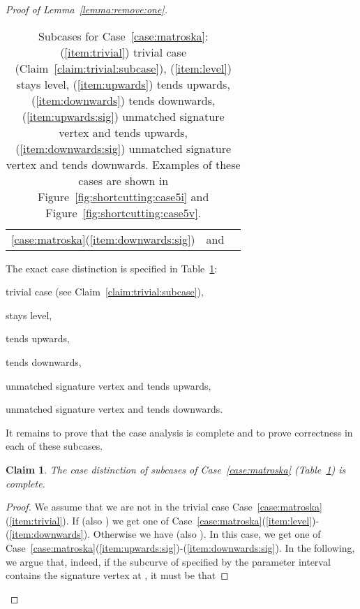 \documentclass[11pt, letter]{article}
\newtheorem{claim}[theorem]{Claim}
\newcommand{\lemref}[1]{Lemma~\ref{lemma:#1}}
\newcommand{\figref}[1]{Figure~\ref{fig:#1}}
\newcommand{\tablab}[1]{\label{tab:#1}}
\newcommand{\tabref}[1]{Table~\ref{tab:#1}}
\newcommand{\caseref}[1]{Case~\ref{case:#1}}
\newcommand{\claimlab}[1]{\label{claim:#1}}
\newcommand{\claimref}[1]{Claim~\ref{claim:#1}}
\begin{document}
\begin{proof}[Proof of \lemref{remove:one}]
\begin{table}[h]
\begin{tabular}{|c|m{7.5cm}|m{5cm}|}
& 
\newline
\newline
\newline
\newline

\\
\hline
\ref{case:matroska}(\ref{item:downwards:sig}) & 
 and \newline

&
\newline
\newline
\\
\hline
\end{tabular}
\caption{Subcases for \caseref{matroska}:
(\ref{item:trivial}) trivial case (\claimref{trivial:subcase}),
(\ref{item:level})  stays level, 
(\ref{item:upwards})  tends upwards,
(\ref{item:downwards})  tends downwards,
(\ref{item:upwards:sig}) unmatched signature vertex and  tends upwards,
(\ref{item:downwards:sig}) unmatched signature vertex and  tends downwards.
Examples of these cases are shown in \figref{shortcutting:case5i} and
\figref{shortcutting:case5v}.
}
\tablab{matroska:subcases}
\end{table}


The exact case distinction is specified in \tabref{matroska:subcases}:
\begin{inparaenum}[(i)]
\item trivial case (see \claimref{trivial:subcase}),\label{item:trivial} 
\item  stays level, \label{item:level}
\item  tends upwards,\label{item:upwards}
\item  tends downwards,\label{item:downwards}
\item unmatched signature vertex and  tends upwards, \label{item:upwards:sig}
\item unmatched signature vertex and  tends downwards. \label{item:downwards:sig}
\end{inparaenum}
It remains to prove that the case analysis is complete and to prove correctness
in each of these subcases.

\begin{claim}
The case distinction of subcases of \caseref{matroska} (\tabref{matroska:subcases}) is complete. 
\claimlab{matroska:complete}
\end{claim}
\begin{proof}
We assume that we are not in the trivial case
\caseref{matroska}(\ref{item:trivial}). 
If  (also ) 
we get one of
\caseref{matroska}(\ref{item:level})-(\ref{item:downwards}).
Otherwise we have  (also ). In this case, we get one of  
\caseref{matroska}(\ref{item:upwards:sig})-(\ref{item:downwards:sig}).
In the following, we argue that, indeed, if the subcurve of  specified by the parameter interval 
 contains the signature vertex at , it must be that 


\end{proof}
\end{proof}
\end{document}
